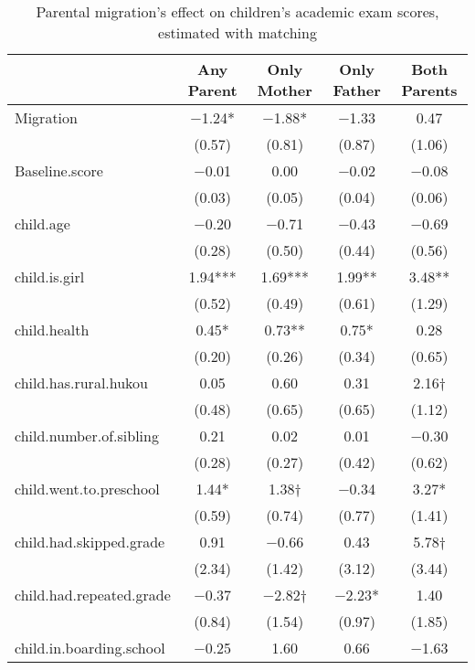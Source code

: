 \documentclass[
  man,floatsintext]{apa7}
\begin{document}
\begin{table}

\caption{Parental migration’s effect on children’s academic exam scores, estimated with matching}
\centering
\begin{tabular}[t]{lcccc}
\toprule
  & Any Parent & Only Mother & Only Father & Both Parents\\
\midrule
Migration & \num{-1.24}* & \num{-1.88}* & \num{-1.33} & \num{0.47}\\
 & (\num{0.57}) & (\num{0.81}) & (\num{0.87}) & (\num{1.06})\\
Baseline.score & \num{-0.01} & \num{0.00} & \num{-0.02} & \num{-0.08}\\
 & (\num{0.03}) & (\num{0.05}) & (\num{0.04}) & (\num{0.06})\\
child.age & \num{-0.20} & \num{-0.71} & \num{-0.43} & \num{-0.69}\\
 & (\num{0.28}) & (\num{0.50}) & (\num{0.44}) & (\num{0.56})\\
child.is.girl & \num{1.94}*** & \num{1.69}*** & \num{1.99}** & \num{3.48}**\\
 & (\num{0.52}) & (\num{0.49}) & (\num{0.61}) & (\num{1.29})\\
child.health & \num{0.45}* & \num{0.73}** & \num{0.75}* & \num{0.28}\\
 & (\num{0.20}) & (\num{0.26}) & (\num{0.34}) & (\num{0.65})\\
child.has.rural.hukou & \num{0.05} & \num{0.60} & \num{0.31} & \num{2.16}†\\
 & (\num{0.48}) & (\num{0.65}) & (\num{0.65}) & (\num{1.12})\\
child.number.of.sibling & \num{0.21} & \num{0.02} & \num{0.01} & \num{-0.30}\\
 & (\num{0.28}) & (\num{0.27}) & (\num{0.42}) & (\num{0.62})\\
child.went.to.preschool & \num{1.44}* & \num{1.38}† & \num{-0.34} & \num{3.27}*\\
 & (\num{0.59}) & (\num{0.74}) & (\num{0.77}) & (\num{1.41})\\
child.had.skipped.grade & \num{0.91} & \num{-0.66} & \num{0.43} & \num{5.78}†\\
 & (\num{2.34}) & (\num{1.42}) & (\num{3.12}) & (\num{3.44})\\
child.had.repeated.grade & \num{-0.37} & \num{-2.82}† & \num{-2.23}* & \num{1.40}\\
 & (\num{0.84}) & (\num{1.54}) & (\num{0.97}) & (\num{1.85})\\
child.in.boarding.school & \num{-0.25} & \num{1.60} & \num{0.66} & \num{-1.63}\\

\end{tabular}
\end{table}
\end{document}
